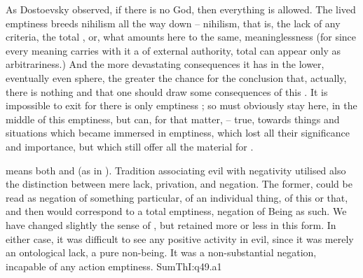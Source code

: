 As Dostoevsky observed, if there is no God, then everything is
allowed.
%
The lived emptiness breeds nihilism all the way down -- nihilism, that is, the
lack of any criteria, the total ,  or, what
amounts here to the same, meaninglessness (for since every
meaning carries with it a  of external authority, total  can appear only as arbitrariness.) 
And the more devastating consequences
it has in the lower, eventually even  sphere, the greater the chance
for the conclusion that, actually, there is nothing and that one should draw
some consequences of this .  It is impossible to exit for there is
only emptiness ; so  must obviously stay here, in the
middle of this emptiness, but  can, for that matter,  -- true,
towards things and situations which became immersed in emptiness, which lost all
their significance and importance, but which still offer all the 
material for . 

\pa
{} means both  and  (as in ).
Tradition associating evil with negativity utilised also the distinction between
mere lack, privation, and  negation. The former,  could be read as
negation of something particular, of an individual thing, of this or that, and
then  would correspond to a total emptiness, negation of
Being as such. We have changed slightly the sense of , but retained
 more or less in this form.
In either case, it was difficult to see any positive activity in evil, since it
was merely an ontological lack, a pure non-being. It was a non-substantial
negation, incapable of any action emptiness.  \citet{For evil is the absence of
  the good [...]  But only good can be a cause [...]}
{SumTh}{I:q49.a1}

